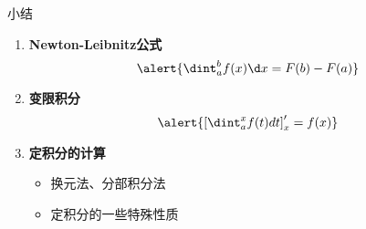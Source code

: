 \begin{frame}[<+->]{小结}
	\linespread{1.5}
	\begin{enumerate}
	  \item {\bf Newton-Leibnitz公式}
	  $$\alert{\dint_a^bf(x)\d x=F(b)-F(a)}$$
	  \item {\bf 变限积分}
	  $$\alert{\left[\dint_a^xf(t)dt\right]'_x=f(x)}$$
	  \item {\bf 定积分的计算}
	  \begin{itemize}
	    \item 换元法、分部积分法
	    \item \alert{定积分的一些特殊性质}
	  \end{itemize}
	\end{enumerate}
\end{frame}


